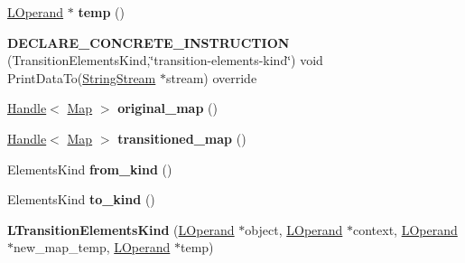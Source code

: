 \begin{DoxyCompactItemize}
\item 
\hyperlink{classv8_1_1internal_1_1_l_operand}{L\+Operand} $\ast$ {\bfseries temp} ()\hypertarget{classv8_1_1internal_1_1_l_transition_elements_kind_a2ba5e82dba18f201527b4d0e75df1ffc}{}\label{classv8_1_1internal_1_1_l_transition_elements_kind_a2ba5e82dba18f201527b4d0e75df1ffc}

\item 
{\bfseries D\+E\+C\+L\+A\+R\+E\+\_\+\+C\+O\+N\+C\+R\+E\+T\+E\+\_\+\+I\+N\+S\+T\+R\+U\+C\+T\+I\+ON} (Transition\+Elements\+Kind,\char`\"{}transition-\/elements-\/kind\char`\"{}) void Print\+Data\+To(\hyperlink{classv8_1_1internal_1_1_string_stream}{String\+Stream} $\ast$stream) override\hypertarget{classv8_1_1internal_1_1_l_transition_elements_kind_ac3d3fcdb1323fb5a8ffe1c35ad9d633e}{}\label{classv8_1_1internal_1_1_l_transition_elements_kind_ac3d3fcdb1323fb5a8ffe1c35ad9d633e}

\item 
\hyperlink{classv8_1_1internal_1_1_handle}{Handle}$<$ \hyperlink{classv8_1_1internal_1_1_map}{Map} $>$ {\bfseries original\+\_\+map} ()\hypertarget{classv8_1_1internal_1_1_l_transition_elements_kind_a1f6534ac0fae8a2a00aacbdb977df2e1}{}\label{classv8_1_1internal_1_1_l_transition_elements_kind_a1f6534ac0fae8a2a00aacbdb977df2e1}

\item 
\hyperlink{classv8_1_1internal_1_1_handle}{Handle}$<$ \hyperlink{classv8_1_1internal_1_1_map}{Map} $>$ {\bfseries transitioned\+\_\+map} ()\hypertarget{classv8_1_1internal_1_1_l_transition_elements_kind_a4ffe4230acac522bfd54c3789ccd213b}{}\label{classv8_1_1internal_1_1_l_transition_elements_kind_a4ffe4230acac522bfd54c3789ccd213b}

\item 
Elements\+Kind {\bfseries from\+\_\+kind} ()\hypertarget{classv8_1_1internal_1_1_l_transition_elements_kind_af634084f5d3f05e0700cc8d35a797465}{}\label{classv8_1_1internal_1_1_l_transition_elements_kind_af634084f5d3f05e0700cc8d35a797465}

\item 
Elements\+Kind {\bfseries to\+\_\+kind} ()\hypertarget{classv8_1_1internal_1_1_l_transition_elements_kind_a131f478caf0a117639ee35cd0bdeed59}{}\label{classv8_1_1internal_1_1_l_transition_elements_kind_a131f478caf0a117639ee35cd0bdeed59}

\item 
{\bfseries L\+Transition\+Elements\+Kind} (\hyperlink{classv8_1_1internal_1_1_l_operand}{L\+Operand} $\ast$object, \hyperlink{classv8_1_1internal_1_1_l_operand}{L\+Operand} $\ast$context, \hyperlink{classv8_1_1internal_1_1_l_operand}{L\+Operand} $\ast$new\+\_\+map\+\_\+temp, \hyperlink{classv8_1_1internal_1_1_l_operand}{L\+Operand} $\ast$temp)\hypertarget{classv8_1_1internal_1_1_l_transition_elements_kind_a7657f031166385be3dcf06f6fec20a59}{}\label{classv8_1_1internal_1_1_l_transition_elements_kind_a7657f031166385be3dcf06f6fec20a59}


\end{DoxyCompactItemize}
